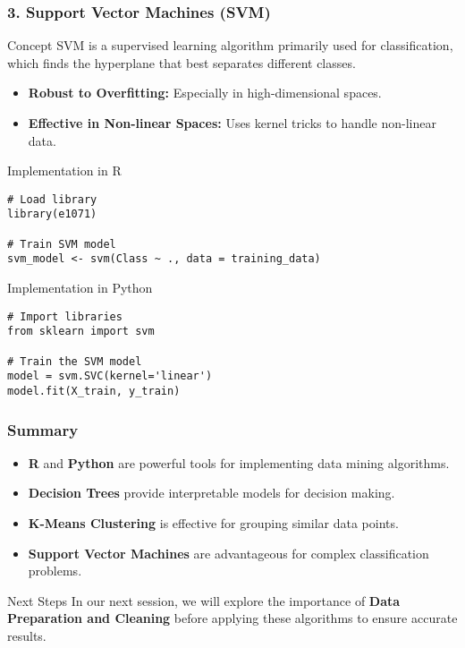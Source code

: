 \documentclass{beamer}
\begin{document}
\begin{frame}[fragile]
    \frametitle{3. Support Vector Machines (SVM)}
    \begin{block}{Concept}
        SVM is a supervised learning algorithm primarily used for classification, which finds the hyperplane that best separates different classes.
    \end{block}

    \begin{itemize}
        \item \textbf{Robust to Overfitting:} Especially in high-dimensional spaces.
        \item \textbf{Effective in Non-linear Spaces:} Uses kernel tricks to handle non-linear data.
    \end{itemize}

    \begin{block}{Implementation in R}
        \begin{lstlisting}
# Load library
library(e1071)

# Train SVM model
svm_model <- svm(Class ~ ., data = training_data)
        \end{lstlisting}
    \end{block}

    \begin{block}{Implementation in Python}
        \begin{lstlisting}
# Import libraries
from sklearn import svm

# Train the SVM model
model = svm.SVC(kernel='linear')
model.fit(X_train, y_train)
        \end{lstlisting}
    \end{block}
\end{frame}

\begin{frame}
    \frametitle{Summary}
    \begin{itemize}
        \item \textbf{R} and \textbf{Python} are powerful tools for implementing data mining algorithms.
        \item \textbf{Decision Trees} provide interpretable models for decision making.
        \item \textbf{K-Means Clustering} is effective for grouping similar data points.
        \item \textbf{Support Vector Machines} are advantageous for complex classification problems.
    \end{itemize}

    \begin{block}{Next Steps}
        In our next session, we will explore the importance of \textbf{Data Preparation and Cleaning} before applying these algorithms to ensure accurate results.
    \end{block}
\end{frame}
\end{document}
